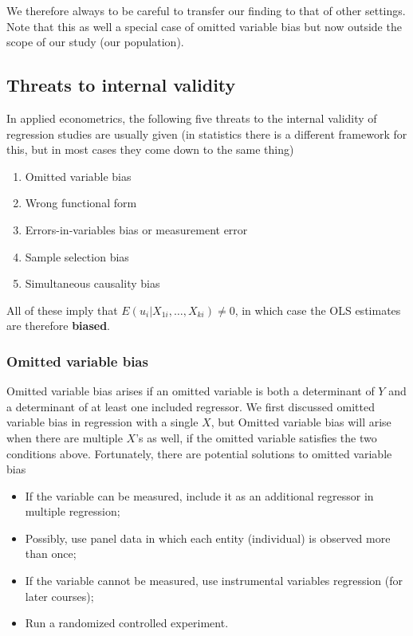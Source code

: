 \documentclass[
]{book}
\providecommand{\tightlist}{%
  \setlength{\itemsep}{0pt}\setlength{\parskip}{0pt}}
\begin{document}
We therefore always to be careful to transfer our finding to that of other settings. Note that this as well a special case of omitted variable bias but now outside the scope of our study (our population).

\hypertarget{threats-to-internal-validity}{%
\subsection{Threats to internal validity}\label{threats-to-internal-validity}}

In applied econometrics, the following five threats to the internal validity of regression studies are usually given (in statistics there is a different framework for this, but in most cases they come down to the same thing)

\begin{enumerate}
\def\labelenumi{\arabic{enumi}.}
\tightlist
\item
  Omitted variable bias
\item
  Wrong functional form
\item
  Errors-in-variables bias or measurement error
\item
  Sample selection bias
\item
  Simultaneous causality bias
\end{enumerate}

All of these imply that \(E(u_i|X_{1i},\ldots,X_{ki}) \neq 0\), in which case the OLS estimates are therefore \textbf{biased}.

\hypertarget{omitted-variable-bias}{%
\subsubsection{Omitted variable bias}\label{omitted-variable-bias}}

Omitted variable bias arises if an omitted variable is both a determinant of \(Y\) and a determinant of at least one included regressor. We first discussed omitted variable bias in regression with a single \(X\), but Omitted variable bias will arise when there are multiple \(X\)'s as well, if the omitted variable satisfies the two conditions above. Fortunately, there are potential solutions to omitted variable bias

\begin{itemize}
\tightlist
\item
  If the variable can be measured, include it as an additional regressor in multiple regression;
\item
  Possibly, use panel data in which each entity (individual) is observed more than once;
\item
  If the variable cannot be measured, use instrumental variables regression (for later courses);
\item
  Run a randomized controlled experiment.
\end{itemize}
\end{document}
